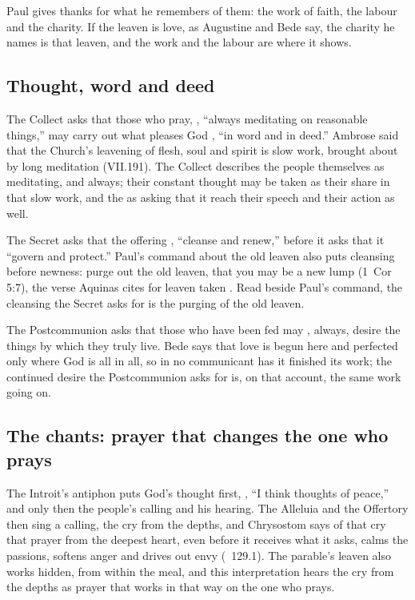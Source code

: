 Paul gives thanks for what he remembers of them: the work of faith, the labour
and the charity. If the leaven is love, as Augustine and Bede say, the charity
he names is that leaven, and the work and the labour are where it shows.

\subsection{Thought, word and deed}
\label{sec:leaven-orations}

The Collect asks that those who pray, , ``always meditating on reasonable things,'' may carry out what
pleases God , ``in word and in deed.''
Ambrose said that the Church's leavening of flesh, soul and spirit is slow
work, brought about by long meditation (VII.191). The Collect describes the
people themselves as meditating, and always; their constant thought
may be taken as their share in that slow work, and the 
as asking that it reach their speech and their action as well.

The Secret asks that the offering ,
``cleanse and renew,'' before it asks that it ``govern and protect.'' Paul's
command about the old leaven also puts cleansing before newness: purge out the
old leaven, that you may be a new lump (1~Cor 5:7), the verse Aquinas cites
for leaven taken . Read beside Paul's command, the cleansing
the Secret asks for is the purging of the old leaven.

The Postcommunion asks that those who have been fed may ,
always, desire the things by which they truly live. Bede says that love is
begun here and perfected only where God is all in all, so in no communicant
has it finished its work; the continued desire the Postcommunion asks for is,
on that account, the same work going on.

\subsection{The chants: prayer that changes the one who prays}
\label{sec:leaven-chants}

The Introit's antiphon puts God's thought first, , ``I think thoughts of peace,'' and only then the people's
calling and his hearing. The Alleluia and the Offertory then sing a calling,
the cry from the depths, and Chrysostom says of that cry that prayer from the
deepest heart, even before it receives what it asks, calms the passions,
softens anger and drives out envy (~129.1). The
parable's leaven also works hidden, from within the meal, and this
interpretation hears the cry from the depths as prayer that works in that way
on the one who prays.

